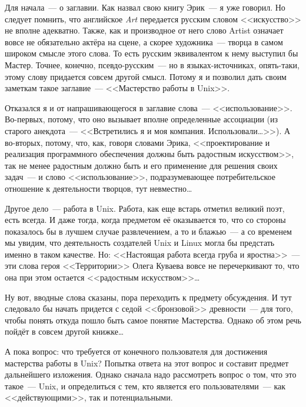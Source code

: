 Для начала~--- о заглавии. Как назвал свою книгу Эрик~--- я уже говорил. Но следует помнить, что английское \textit{Art} передается русским словом <<искусство>> не вполне адекватно. Также, как и производное от него слово Artist означает вовсе не обязательно актёра на сцене, а скорее художника~--- творца в самом широком смысле этого слова. То есть русским эквивалентом к нему выступил бы Мастер. Точнее, конечно, псевдо-русским~--- но в языках-источниках, опять-таки, этому слову придается совсем другой смысл. Потому я и позволил дать своим заметкам такое заглавие~--- <<Мастерство работы в Unix>>.

Отказался я и от напрашивающегося в заглавие слова~--- <<использование>>. Во-первых, потому, что оно вызывает вполне определенные ассоциации (из старого анекдота~--- <<Встретились я и моя компания. Использовали\dots>>). А во-вторых, потому, что, как, говоря словами Эрика, <<проектирование и реализация программного обеспечения должны быть радостным искусством>>, так не менее радостным должно быть и его применение для решения своих задач~--- и слово <<использование>>, подразумевающее потребительское отношение к деятельности творцов, тут невместно\dots

Другое дело~--- работа в Unix. Работа, как еще встарь отметил великий поэт, есть всегда. И даже тогда, когда предметом её оказывается то, что со стороны показалось бы в лучшем случае развлечением, а то и блажью~--- а со временем мы увидим, что деятельность создателей Unix и Linux могла бы предстать именно в таком качестве. Но: <<Настоящая работа всегда груба и яростна>>~--- эти слова героя <<Территории>> Олега Куваева вовсе не перечеркивают то, что она при этом остается <<радостным искусством>>\dots

Ну вот, вводные слова сказаны, пора переходить к предмету обсуждения. И тут следовало бы начать придется с седой <<бронзовой>> древности~--- для того, чтобы понять откуда пошло быть самое понятие Мастерства. Однако об этом речь пойдёт в совсем другой книжке\dots

А пока вопрос: что требуется от конечного пользователя для достижения мастерства работы в Unix? Попытка ответа на этот вопрос и составит предмет дальнейшего изложения. Однако сначала надо рассмотреть вопрос о том, что это такое~--- Unix, и определиться с тем, кто является его пользователями~--- как <<действующими>>, так и потенциальными.

